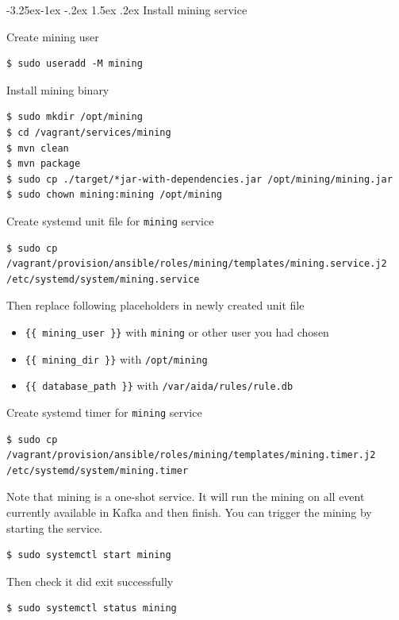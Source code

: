 \documentclass[a4paper]{article} %
\makeatletter
\renewcommand{\normalsize}{\fontsize{12}{15}\selectfont\color{textcolor}}
\renewcommand\subsubsection{\@startsection{subsubsection}{3}{\z@}%
                   {-3.25ex\@plus -1ex \@minus -.2ex}%
                   {1.5ex \@plus .2ex}%
                   {\normalfont\sffamily\normalsize\bfseries\color{projectcolor}}}
\makeatother
\begin{document}
\subsubsection{Install mining service}

Create mining user
\begin{lstlisting}
$ sudo useradd -M mining
\end{lstlisting}

Install mining binary
\begin{lstlisting}
$ sudo mkdir /opt/mining
$ cd /vagrant/services/mining
$ mvn clean
$ mvn package
$ sudo cp ./target/*jar-with-dependencies.jar /opt/mining/mining.jar
$ sudo chown mining:mining /opt/mining
\end{lstlisting}

Create systemd unit file for \texttt{mining} service
\begin{lstlisting}
$ sudo cp /vagrant/provision/ansible/roles/mining/templates/mining.service.j2 /etc/systemd/system/mining.service
\end{lstlisting}

Then replace following placeholders in newly created unit file
\begin{itemize}[noitemsep,nolistsep]
\item \texttt{\{\{ mining\_user \}\}} with \texttt{mining} or other user you had chosen
\item \texttt{\{\{ mining\_dir \}\}} with \texttt{/opt/mining}
\item \texttt{\{\{ database\_path \}\}} with \texttt{/var/aida/rules/rule.db}
\end{itemize}

Create systemd timer for \texttt{mining} service
\begin{lstlisting}
$ sudo cp /vagrant/provision/ansible/roles/mining/templates/mining.timer.j2 /etc/systemd/system/mining.timer
\end{lstlisting}

Note that mining is a one-shot service. It will run the mining on all event currently available in Kafka and then finish.
You can trigger the mining by starting the service.
\begin{lstlisting}
$ sudo systemctl start mining
\end{lstlisting}

Then check it did exit successfully
\begin{lstlisting}
$ sudo systemctl status mining
\end{lstlisting}
\end{document}
